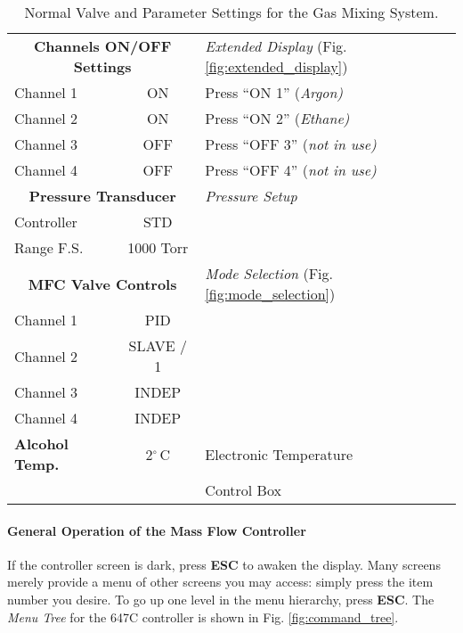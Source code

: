 \begin{table}[hbt]
\begin{minipage}[h!]{\textwidth}
{\begin{center}
\begin{tabular}{|l|c|l|}
\multicolumn{2}{|c|}{\bf Channels ON/OFF Settings} & {\it Extended Display} (Fig. \ref{fig:extended_display})   \\
Channel 1   & ON       &                   Press ``ON 1'' (\em Argon)  \\
Channel 2   & ON       &                   Press ``ON 2'' (\em Ethane) \\
Channel 3   & OFF      &                   Press ``OFF 3'' (\em not in use) \\
Channel 4   & OFF      &                   Press ``OFF 4'' (\em not in use) \\ \hline
\multicolumn{2}{|c|}{\bf Pressure Transducer} & {\it Pressure Setup}  \\
Controller  & STD      &                   \\ 
Range F.S.  & 1000 Torr&                   \\ \hline
\multicolumn{2}{|c|}{\bf MFC Valve Controls     } & {\it Mode Selection} (Fig. \ref{fig:mode_selection}) \\
Channel 1   & PID      &                                   \\
Channel 2   & SLAVE / 1&                                   \\
Channel 3   & INDEP    &                                   \\
Channel 4   & INDEP    &                                   \\ \hline
\bf Alcohol Temp. & 2$^\circ$\,C & Electronic Temperature  \\
                  &              & Control Box             \\ \hline
\hline
\end{tabular}
\end{center}
}%
\end{minipage}
\caption{Normal Valve and Parameter Settings for the Gas Mixing System.
\label{tab:mixer_nominals}}
\end{table}
\paragraph{General Operation of the Mass Flow Controller}
If the controller screen is dark, press {\bf ESC} to awaken the
display.  Many screens merely provide a menu of other screens you may
access: simply press the item number you desire. To go up one level in
the menu hierarchy, press {\bf ESC}. The \emph{Menu Tree} for the 647C
controller is shown in Fig. \ref{fig:command_tree}.

